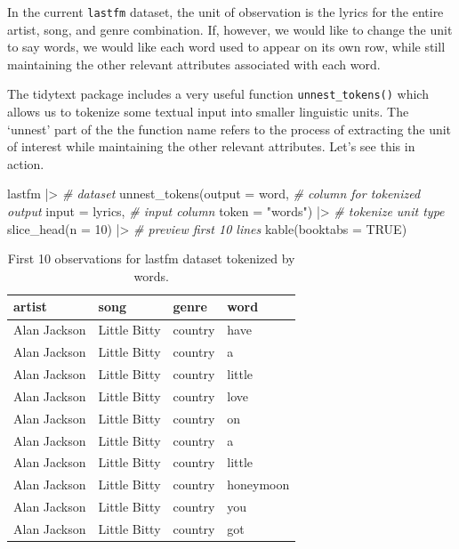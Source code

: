 \documentclass[
  letterpaper,
]{latex/krantz}
\newenvironment{Shaded}{\begin{snugshade}}{\end{snugshade}}
\newcommand{\AttributeTok}[1]{\textcolor[rgb]{0.00,0.00,0.00}{#1}}
\newcommand{\CommentTok}[1]{\textcolor[rgb]{0.00,0.00,0.00}{\textit{#1}}}
\newcommand{\ConstantTok}[1]{\textcolor[rgb]{0.00,0.00,0.00}{#1}}
\newcommand{\DecValTok}[1]{\textcolor[rgb]{0.00,0.00,0.00}{#1}}
\newcommand{\FunctionTok}[1]{\textcolor[rgb]{0.00,0.00,0.00}{#1}}
\newcommand{\NormalTok}[1]{\textcolor[rgb]{0.00,0.00,0.00}{#1}}
\newcommand{\SpecialCharTok}[1]{\textcolor[rgb]{0.00,0.00,0.00}{#1}}
\newcommand{\StringTok}[1]{\textcolor[rgb]{0.00,0.00,0.00}{#1}}
\begin{document}
In the current \texttt{lastfm} dataset, the unit of observation is the
lyrics for the entire artist, song, and genre combination. If, however,
we would like to change the unit to say words, we would like each word
used to appear on its own row, while still maintaining the other
relevant attributes associated with each word.

The tidytext package includes a very useful function
\texttt{unnest\_tokens()} which allows us to tokenize some textual input
into smaller linguistic units. The `unnest' part of the the function
name refers to the process of extracting the unit of interest while
maintaining the other relevant attributes. Let's see this in action.

\begin{Shaded}
\begin{Highlighting}[]
\NormalTok{lastfm }\SpecialCharTok{|\textgreater{}} \CommentTok{\# dataset}
  \FunctionTok{unnest\_tokens}\NormalTok{(}\AttributeTok{output =}\NormalTok{ word, }\CommentTok{\# column for tokenized output}
                \AttributeTok{input =}\NormalTok{ lyrics, }\CommentTok{\# input column}
                \AttributeTok{token =} \StringTok{"words"}\NormalTok{) }\SpecialCharTok{|\textgreater{}} \CommentTok{\# tokenize unit type}
  \FunctionTok{slice\_head}\NormalTok{(}\AttributeTok{n =} \DecValTok{10}\NormalTok{) }\SpecialCharTok{|\textgreater{}}  \CommentTok{\# preview first 10 lines}
  \FunctionTok{kable}\NormalTok{(}\AttributeTok{booktabs =} \ConstantTok{TRUE}\NormalTok{)}
\end{Highlighting}
\end{Shaded}

\hypertarget{tbl-td-lastfm-tokenize-words}{}
\begin{table}
\caption{\label{tbl-td-lastfm-tokenize-words}First 10 observations for lastfm dataset tokenized by words. }\tabularnewline

\centering
\begin{tabular}{llll}
\toprule
artist & song & genre & word\\
\midrule
Alan Jackson & Little Bitty & country & have\\
Alan Jackson & Little Bitty & country & a\\
Alan Jackson & Little Bitty & country & little\\
Alan Jackson & Little Bitty & country & love\\
Alan Jackson & Little Bitty & country & on\\
\addlinespace
Alan Jackson & Little Bitty & country & a\\
Alan Jackson & Little Bitty & country & little\\
Alan Jackson & Little Bitty & country & honeymoon\\
Alan Jackson & Little Bitty & country & you\\
Alan Jackson & Little Bitty & country & got\\
\bottomrule
\end{tabular}
\end{table}
\end{document}
